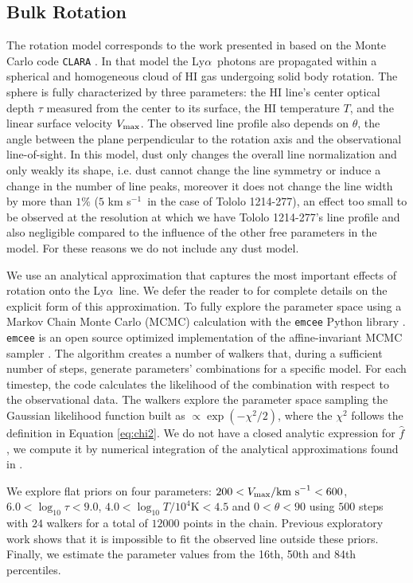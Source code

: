 \documentclass[a4,useAMS,usenatbib,usegraphicx]{mn2e}
\newcommand{\tol}{Tololo 1214-277}
\newcommand{\lya}{\ifmmode{{\rm Ly}\alpha}\else Ly$\alpha$\ \fi}
\newcommand{\kms}{km s$^{-1}$}
\begin{document}
\subsection{Bulk Rotation}

The rotation model corresponds to the work presented in
\citep{GaravitoCamargo2014} based on the Monte Carlo code
\texttt{CLARA} \citep{CLARA}. 
In that model the \lya photons are propagated 
within a spherical and homogeneous cloud of HI gas undergoing solid
body rotation.
The sphere is fully characterized by three parameters: the HI line's
center optical  depth $\tau$ measured from the center to its surface, the HI
temperature $T$, and the linear surface velocity $V_{\rm max}$.  
The observed line profile also depends on $\theta$,  the angle between the plane
perpendicular to the rotation axis and the observational
line-of-sight.  
In this model, dust only changes the overall line
normalization and only weakly its shape, i.e. 
dust cannot change the line symmetry or induce a change in the number
of line peaks, moreover it does not change the line width by more than
$1\%$ ($5$ \kms\ in the case of \tol), an effect too small to be
observed at the resolution at which we have \tol's line profile and
also negligible compared to the influence of the other free parameters in the model.
For these reasons we do not include any dust model. 

We use an analytical approximation that captures the most important
effects of rotation onto the \lya line. 
We defer the reader to \citet{GaravitoCamargo2014} for complete
details on the explicit form of this approximation.
To fully explore the
parameter space using a Markov Chain Monte Carlo (MCMC) calculation with the
\texttt{emcee} Python library \citep{2013PASP..125..306F}. \texttt{emcee} 
is an open source optimized implementation of the affine-invariant 
MCMC sampler \citep{goodman2010ensemble}. 
The algorithm creates a number of walkers that,
during a sufficient number of steps, generate parameters' combinations
for a specific model.
For each timestep, the code calculates the likelihood of the
combination with respect to the observational data.
The walkers explore the parameter space sampling the Gaussian likelihood
function built as $\propto \exp(-\chi^2/2)$, where the $\chi^2$ follows
the definition in Equation \ref{eq:chi2}. 
We do not have a closed analytic expression for $\hat{f}$, we compute it
by numerical integration of the analytical approximations found in
\citet{GaravitoCamargo2014}.  

We explore flat priors on four parameters: $200<V_{\rm
  max}/\mathrm{km\ s}^{-1} <600$,   $6.0<\log_{10}\tau<9.0$,
$4.0<\log_{10} T/10^4\mathrm{K}< 4.5$ and $0<\theta<90$ using $500$
steps with $24$ walkers for a total of $12000$ points in the chain.
Previous exploratory work shows that it is impossible to fit the
observed line outside these priors.
Finally, we estimate the parameter values from the 16th, 50th and 84th
percentiles. 
\end{document}

